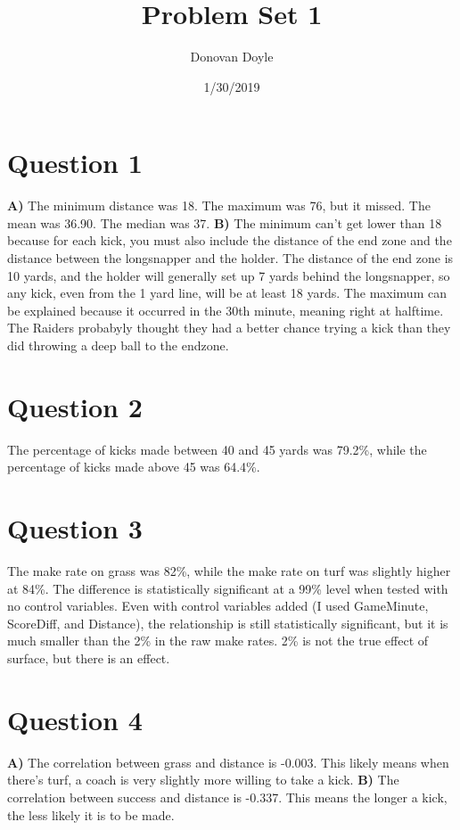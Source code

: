 \documentclass[]{article}
\title{Problem Set 1}
\author{Donovan Doyle}
\date{1/30/2019}
\begin{document}
\maketitle

\section{Question 1}\label{question-1}

\textbf{A)} The minimum distance was 18. The maximum was 76, but it
missed. The mean was 36.90. The median was 37. \textbf{B)} The minimum
can't get lower than 18 because for each kick, you must also include the
distance of the end zone and the distance between the longsnapper and
the holder. The distance of the end zone is 10 yards, and the holder
will generally set up 7 yards behind the longsnapper, so any kick, even
from the 1 yard line, will be at least 18 yards. The maximum can be
explained because it occurred in the 30th minute, meaning right at
halftime. The Raiders probabyly thought they had a better chance trying
a kick than they did throwing a deep ball to the endzone.

\section{Question 2}\label{question-2}

The percentage of kicks made between 40 and 45 yards was 79.2\%, while
the percentage of kicks made above 45 was 64.4\%.

\section{Question 3}\label{question-3}

The make rate on grass was 82\%, while the make rate on turf was
slightly higher at 84\%. The difference is statistically significant at
a 99\% level when tested with no control variables. Even with control
variables added (I used GameMinute, ScoreDiff, and Distance), the
relationship is still statistically significant, but it is much smaller
than the 2\% in the raw make rates. 2\% is not the true effect of
surface, but there is an effect.

\section{Question 4}\label{question-4}

\textbf{A)} The correlation between grass and distance is -0.003. This
likely means when there's turf, a coach is very slightly more willing to
take a kick. \textbf{B)} The correlation between success and distance is
-0.337. This means the longer a kick, the less likely it is to be made.
\end{document}
